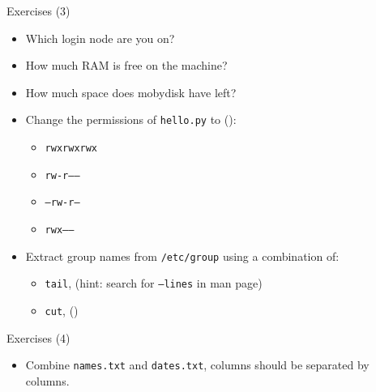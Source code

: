 \documentclass[hyperref={pdfpagelabels=false},12pt]{beamer}
\newcommand{\mybutton}[2]{\hyperlink{#1}{\beamerbutton{{#2}}}}
\begin{document}
\begin{frame}[label=exercises-3]{Exercises (3)}
    \begin{itemize}
        \item Which login node are you on?
        \item How much RAM is free on the machine?
        \item How much space does mobydisk have left?
        \item Change the permissions of \texttt{hello.py} to (\mybutton{permissions}{hint}):
        \begin{itemize}
            \item \texttt{rwxrwxrwx}
            \item \texttt{rw-r-----}
            \item \texttt{---rw-r--}
            \item \texttt{rwx------}
        \end{itemize}
        \item Extract group names from \texttt{/etc/group} using a combination of:
            \begin{itemize}
                \item \texttt{tail}, (hint: search for \texttt{--lines} in man page)
                \item \texttt{cut}, (\mybutton{cut-and-paste}{hint})
            \end{itemize}
    \end{itemize}
\end{frame}

\begin{frame}[label=exercises-4]{Exercises (4)}
    \begin{itemize}
        \item Combine \texttt{names.txt} and \texttt{dates.txt}, columns should be separated by columns. 
    \end{itemize}
\end{frame}
\end{document}
